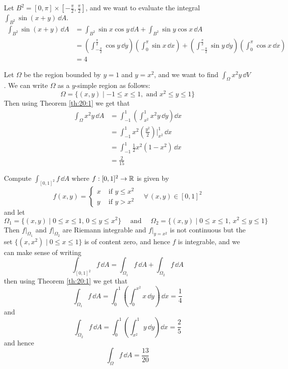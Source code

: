 \documentclass[../Analysis-3.tex]{subfiles}
\begin{document}
\begin{Eg}{}{}
  Let $B^2 = [0,\pi] \times [-\frac{\pi}{2}, \frac{\pi}{2}]$, and we want to evaluate the integral $\displaystyle\int_{B^2} \sin (x+y) \, \dd A$.
  \begin{align*}
    \int_{B^2}\sin(x+y) \, \dd A
     & = \int_{B^2} \sin x \cos y \, \dd A + \int_{B^2} \sin y \cos x \, \dd A                                                                                                                                                             \\
     & = \left( \int_{-\frac{\pi}{2}}^{\frac{\pi}{2}} \cos y \, \dd y\right)\left( \int_{0}^{\pi} \sin x \, \dd x\right) + \left( \int_{-\frac{\pi}{2}}^{\frac{\pi}{2}} \sin y \, \dd y\right)\left( \int_{0}^{\pi} \cos x \, \dd x\right) \\
     & = 4
  \end{align*}
\end{Eg}

\begin{Eg}{}{}
  Let $\Omega$ be the region bounded by $y = 1$ and $y = x^2$, and we want to find $\displaystyle\int_{\Omega} x^2y \, \dd V$. We can write $\Omega$ as a $y$-simple region as follows:
  \[
    \Omega = \{ (x,y) \mid -1 \leq x \leq 1, \mbox{ and } x^2 \leq y \leq 1 \}
  \]
  Then using Theorem \ref{th:20:1} we get that
  \begin{align*}
    \int_{\Omega} x^2y \, \dd A
     & = \int_{-1}^1 \left( \int_{x^2}^1 x^2y \, \dd y\right)\dd x               \\
     & = \int_{-1}^1 x^2 \left( \frac{y^2}{2} \right)\bigg\vert_{x^2}^1 \, \dd x \\
     & = \int_{-1}^1 \frac{1}{2} x^2(1-x^2) \, \dd x                             \\
     & = \frac{2}{15}
  \end{align*}
\end{Eg}

\begin{Eg}{}{}
  Compute $\displaystyle\int_{[0,1]^2} f \, \dd A$ where $f : [0,1]^2 \to \mathbb{R}$ is given by
  \[
    f(x,y) = \begin{cases}
      x & \mbox{ if } y \leq x^2 \\ y & \mbox{ if } y > x^2
    \end{cases} \quad \forall \, (x,y) \in [0,1]^2
  \]
  and let
  \[
    \Omega_1 = \{ (x,y) \mid 0 \leq x \leq 1, \, 0 \leq y \leq x^2 \} \quad \mbox{ and } \quad \Omega_2 = \{ (x,y) \mid 0 \leq x \leq 1, \, x^2 \leq y \leq 1 \}
  \]
  Then $f\vert_{\Omega_1}$ and $f\vert_{\Omega_2}$ are Riemann integrable and $f\vert_{y=x^2}$ is not continuous but the set $\{ (x,x^2) \mid 0 \leq x \leq 1 \}$ is of content zero, and hence $f$ is integrable, and we can make sense of writing
  \[
    \int_{[0,1]^2} f \, \dd A = \int_{\Omega_1} f \, \dd A + \int_{\Omega_2} f \, \dd A
  \]
  then using Theorem \ref{th:20:1} we get that
  \[
    \int_{\Omega_1} f \, \dd A = \int_0^1 \left( \int_0^{x^2} x \, \dd y \right)\, \dd x = \frac{1}{4}
  \]
  and
  \[
    \int_{\Omega_2} f \, \dd A = \int_0^1 \left( \int_{x^2}^1 y \, \dd y\right)\dd x = \frac{2}{5}
  \]
  and hence
  \[
    \int_{\Omega} f \, \dd A = \frac{13}{20}
  \]
\end{Eg}
\end{document}
